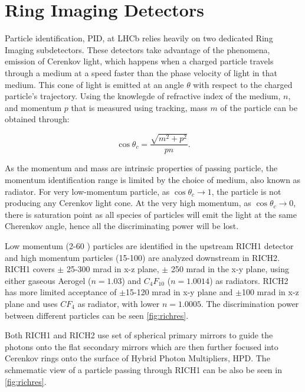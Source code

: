 \section{Ring Imaging Detectors}
Particle identification, \Gls{PID}, at \Gls{LHCb} relies heavily on two dedicated Ring Imaging subdetectors. These detectors take advantage of the phenomena, emission of Cerenkov light, which happens when a charged particle travels through a medium at a speed faster than the phase velocity of light in that medium. This cone of light is emitted at an angle $\theta$ with respect to the charged particle's trajectory. Using the knowlegde of refractive index of the medium, $n$, and momentum $p$ that is measured using tracking, mass $m$ of the particle can be obtained through:

\begin{equation}
	\cos\theta_{c} =  \frac{\sqrt{m^{2} + p^{2}}}{pn}.
\end{equation}

As the momentum and mass are intrinsic properties of passing particle, the momentum identification range is limited by the choice of medium, also known as radiator. For very low-momentum particle, as $\cos\theta_{c} \rightarrow 1$, the particle is not producing any Cerenkov light cone. At the very high momentum, as $\cos\theta_{c} \rightarrow 0$, there is saturation point as all species of particles will emit the light at the same Cherenkov angle, hence all the discriminating power will be lost.

Low momentum (2-60 \gev) particles are identified in the upstream RICH1 detector and high momentum particles (15-100) \gev are analyzed downstream in RICH2. RICH1 covers $\pm$ 25-300 mrad in x-z plane, $\pm$ 250 mrad in the x-y plane, using either gaseous Aerogel ($n=1.03$) and $C_{4}F_{10}$ ($n = 1.0014$) as radiators. RICH2 has more limited acceptance of $\pm$15-120 mrad in x-y plane and $\pm$100 mrad in x-z plane and uses $CF_{4}$ as radiator, with lower $n=1.0005$. The discrimination power between different particles can be seen \autoref{fig:richres}. 


Both RICH1 and RICH2 use set of spherical primary mirrors to guide the photons onto the flat secondary mirrors which are then further focused into Cerenkov rings onto the surface of Hybrid Photon Multipliers, \Gls{HPD}. The schmematic view of a particle passing through RICH1 can be also be seen in \autoref{fig:richres}. 


